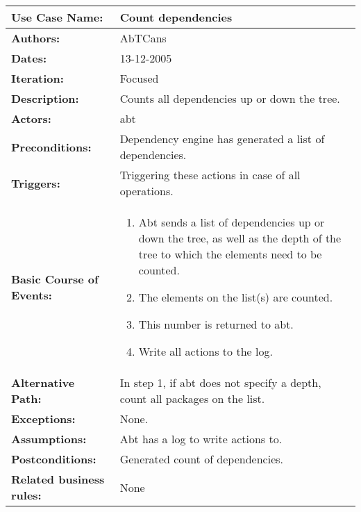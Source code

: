 \begin{tabularx}{\linewidth}{|l|X|}
\hline
\textbf{Use Case Name:} & \textbf{Count dependencies} \\
\hline
\textbf{Authors:} & AbTCans\\
\hline
\textbf{Dates:} & 13-12-2005\\
\hline
\textbf{Iteration:} & Focused\\
\hline
\textbf{Description:} & Counts all dependencies up or down the tree.\\
\hline
\textbf{Actors:} & abt\\ 
\hline
\textbf{Preconditions:} & Dependency engine has generated a list of dependencies.\\
\hline
\textbf{Triggers:} & Triggering these actions in case of all operations.\\
\hline
\textbf{Basic Course of Events:} & 
\begin{minipage}{\linewidth} 
  \vspace{0.05em}
  \begin{enumerate}
   \item Abt sends a list of dependencies up or down the tree, as well as the depth of the tree to which the elements need to be counted.
   \item The elements on the list(s) are counted.
   \item This number is returned to abt.
   \item Write all actions to the log.
  \end{enumerate}
  \vspace{0.05em}
\end{minipage}
\\
\hline 
\textbf{Alternative Path:} & In step 1, if abt does not specify a depth, count all packages on the list.\\
\hline
\textbf{Exceptions:} & None. \\
\hline
\textbf{Assumptions:} & Abt has a log to write actions to. \\
\hline
\textbf{Postconditions:} & Generated count of dependencies.\\
\hline
\textbf{Related business rules:} & None\\
\hline
\end{tabularx}


     